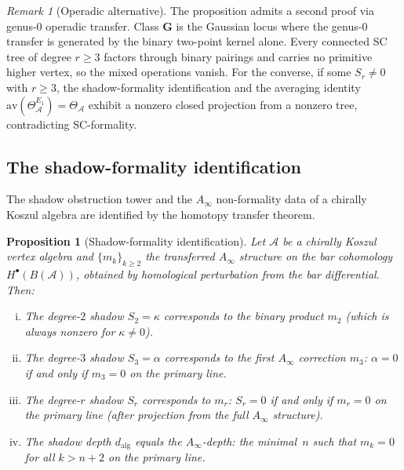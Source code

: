 \documentclass[11pt,reqno]{amsart}
\newtheorem{proposition}[theorem]{Proposition}
\theoremstyle{definition}
\theoremstyle{remark}
\newtheorem{remark}[theorem]{Remark}
\newcommand{\cA}{\mathcal{A}}
\numberwithin{equation}{section}
\begin{document}
\begin{remark}[Operadic alternative]\label{rem:sc-operadic}
The proposition admits a second proof via genus-$0$
operadic transfer. Class $\mathbf{G}$ is the Gaussian
locus where the genus-$0$ transfer is generated by the
binary two-point kernel alone. Every connected SC tree of
degree $r \ge 3$ factors through binary pairings and
carries no primitive higher vertex, so the mixed operations
vanish. For the converse, if some $S_r \ne 0$ with
$r \ge 3$, the shadow-formality identification and the
averaging identity $\mathrm{av}(\Theta_\cA^{E_1}) =
\Theta_\cA$ exhibit a nonzero closed projection from a
nonzero tree, contradicting SC-formality.
\end{remark}



\subsection{The shadow-formality
identification}\label{subsec:shadow-formality}

The shadow obstruction tower and the $A_\infty$
non-formality data of a chirally Koszul algebra are
identified by the homotopy transfer theorem.

\begin{proposition}[Shadow-formality
identification]\label{prop:shadow-formality}
Let $\cA$ be a chirally Koszul vertex algebra and
$\{m_k\}_{k \ge 2}$ the transferred $A_\infty$ structure
on the bar cohomology $H^\bullet(B(\cA))$, obtained by
homological perturbation from the bar differential. Then:
\begin{enumerate}[(i)]
\item The degree-$2$ shadow $S_2 = \kappa$ corresponds to
 the binary product $m_2$ (which is always nonzero for
 $\kappa \ne 0$).
\item The degree-$3$ shadow $S_3 = \alpha$ corresponds to
 the first $A_\infty$ correction $m_3$:
 $\alpha = 0$ if and only if $m_3 = 0$ on the primary
 line.
\item The degree-$r$ shadow $S_r$ corresponds to $m_r$:
 $S_r = 0$ if and only if $m_r = 0$ on the primary line
 (after projection from the full $A_\infty$ structure).
\item The shadow depth $d_{\mathrm{alg}}$ equals the
 $A_\infty$-depth: the minimal~$n$ such that
 $m_k = 0$ for all $k > n + 2$ on the primary line.
\end{enumerate}
\end{proposition}
\end{document}
